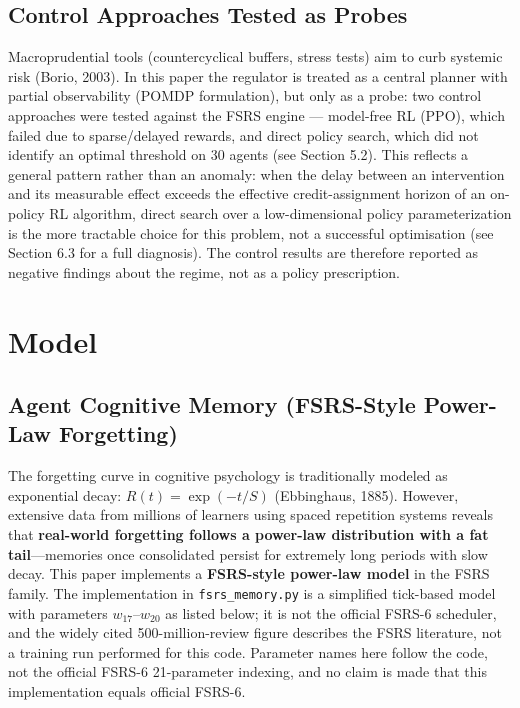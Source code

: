 \documentclass[11pt]{article}
\begin{document}
\subsection{Control Approaches Tested as Probes}
Macroprudential tools (countercyclical buffers, stress tests) aim to curb systemic risk (Borio, 2003). In this paper the regulator is treated as a central planner with partial observability (POMDP formulation), but only as a probe: two control approaches were tested against the FSRS engine --- model-free RL (PPO), which failed due to sparse/delayed rewards, and direct policy search, which did not identify an optimal threshold on 30 agents (see Section 5.2). This reflects a general pattern rather than an anomaly: when the delay between an intervention and its measurable effect exceeds the effective credit-assignment horizon of an on-policy RL algorithm, direct search over a low-dimensional policy parameterization is the more tractable choice for this problem, not a successful optimisation (see Section 6.3 for a full diagnosis). The control results are therefore reported as negative findings about the regime, not as a policy prescription.

\section{Model}
\subsection{Agent Cognitive Memory (FSRS-Style Power-Law Forgetting)}
The forgetting curve in cognitive psychology is traditionally modeled as exponential decay: $R(t) = \exp(-t/S)$ (Ebbinghaus, 1885). However, extensive data from millions of learners using spaced repetition systems reveals that \textbf{real-world forgetting follows a power-law distribution with a fat tail}---memories once consolidated persist for extremely long periods with slow decay. This paper implements a \textbf{FSRS-style power-law model} in the FSRS family. The implementation in \texttt{fsrs\_memory.py} is a simplified tick-based model with parameters $w_{17}$--$w_{20}$ as listed below; it is not the official FSRS-6 scheduler, and the widely cited 500-million-review figure describes the FSRS literature, not a training run performed for this code. Parameter names here follow the code, not the official FSRS-6 21-parameter indexing, and no claim is made that this implementation equals official FSRS-6.
\end{document}
